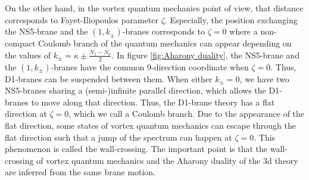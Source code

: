 \documentclass[a4paper,11pt]{article}
\begin{document}
On the other hand, in the vortex quantum mechanics point of view, that distance corresponds to Fayet-Iliopoulos parameter $\zeta$. Especially, the position exchanging the NS5-brane and the $(1,k_\pm)$-branes corresponds to $\zeta = 0$ where a non-compact Coulomb branch of the quantum mechanics can appear depending on the values of $k_\pm = \kappa \pm \frac{N_f-N_a}{2}$. In figure \ref{fig:Aharony duality}, the NS5-brane and the $(1,k_\pm)$-branes have the common 9-direction coordinate when $\zeta = 0$. Thus, D1-branes can be suspended between them. When either $k_\pm = 0$, we have two NS5-branes sharing a (semi-)infinite parallel direction, which allows the D1-branes to move along that direction. Thus, the D1-brane theory has a flat direction at $\zeta = 0$, which we call a Coulomb branch. Due to the appearance of the flat direction, some states of vortex quantum mechanics can escape through the flat direction such that a jump of the spectrum can happen at $\zeta = 0$. This phenomenon is called the wall-crossing. The important point is that the wall-crossing of vortex quantum mechanics and the Aharony duality of the 3d theory are inferred from the same brane motion.
\\
\end{document}

